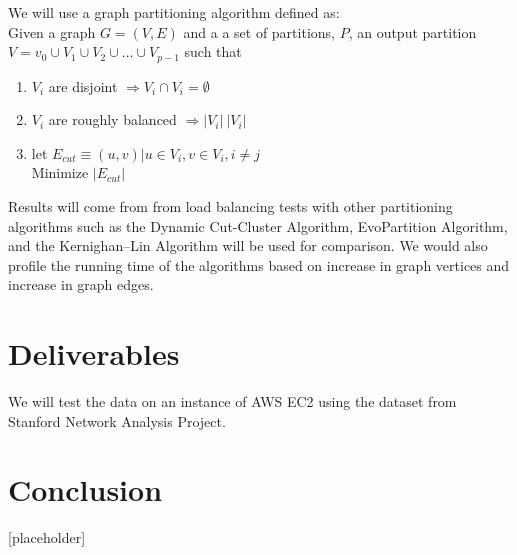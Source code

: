 \documentclass[10pt]{article}
\begin{document}
\begin{multicols}{2}
  We will use a graph partitioning algorithm defined as:\\
  Given a graph $G = (V,E)$ and a a set of partitions, $P$, an output partition $V = v_0 \cup V_1 \cup V_2 \cup \ldots \cup V_{p-1}$ such that
  \begin{enumerate}
  \item ${V_i}$ are disjoint $\Rightarrow V_i \cap V_i = \emptyset$
  \item ${V_i}$ are roughly balanced $\Rightarrow |V_i| ~ |V_i|$
  \item let $E_{cut} \equiv {(u,v) | u \in V_i, v \in V_i, i \neq j}$\\
    Minimize $|E_{cut}|$
  \end{enumerate}
Results will come from from load balancing tests with other partitioning algorithms such as the Dynamic Cut-Cluster Algorithm, EvoPartition Algorithm, and the Kernighan–Lin Algorithm will be used for comparison. We would also profile the running time of the algorithms based on increase in graph vertices and increase in graph edges.
  \section{Deliverables}
  We will test the data on an  instance of AWS EC2 using the dataset from Stanford Network Analysis Project.
  
   \section{Conclusion}
   [placeholder]
   
   
\end{multicols}
\end{document}
